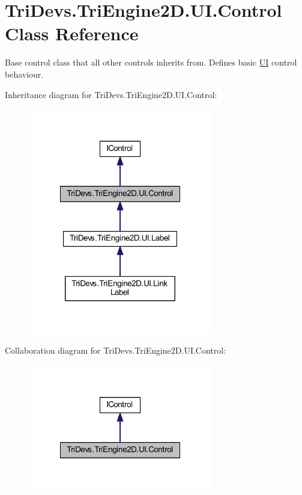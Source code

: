 \hypertarget{class_tri_devs_1_1_tri_engine2_d_1_1_u_i_1_1_control}{\section{Tri\-Devs.\-Tri\-Engine2\-D.\-U\-I.\-Control Class Reference}
\label{class_tri_devs_1_1_tri_engine2_d_1_1_u_i_1_1_control}
}


Base control class that all other controls inherits from. Defines basic \hyperlink{namespace_tri_devs_1_1_tri_engine2_d_1_1_u_i}{U\-I} control behaviour.  




Inheritance diagram for Tri\-Devs.\-Tri\-Engine2\-D.\-U\-I.\-Control\-:\nopagebreak
\begin{figure}[H]
\begin{center}
\leavevmode
\includegraphics[width=228pt]{class_tri_devs_1_1_tri_engine2_d_1_1_u_i_1_1_control__inherit__graph}
\end{center}
\end{figure}


Collaboration diagram for Tri\-Devs.\-Tri\-Engine2\-D.\-U\-I.\-Control\-:\nopagebreak
\begin{figure}[H]
\begin{center}
\leavevmode
\includegraphics[width=228pt]{class_tri_devs_1_1_tri_engine2_d_1_1_u_i_1_1_control__coll__graph}
\end{center}
\end{figure}

